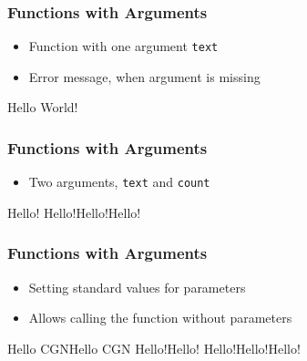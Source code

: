 \documentclass[ngerman]{beamer}
\newcommand{\ta}[1]{\textattachfile[color=1 0 0]{#1}{Code}}
\begin{document}
\begin{frame}[containsverbatim]
\frametitle{Functions with Arguments}

\begin{itemize}
	\item Function with one argument \texttt{text} 
	\item Error message, when argument is missing
\end{itemize}



\begin{ausgabe}
Hello World!
\end{ausgabe}

\end{frame}



\begin{frame}[containsverbatim]
\frametitle{Functions with Arguments}

\begin{itemize}
	\item Two arguments, \texttt{text} and \texttt{count}
\end{itemize}



\begin{ausgabe}

Hello!
Hello!Hello!Hello!

\end{ausgabe}

\end{frame}

\begin{frame}[containsverbatim]
\frametitle{Functions with Arguments}

\begin{itemize}
	\item Setting standard values for parameters
	\item Allows calling the function without parameters
\end{itemize}



\begin{ausgabe}
Hello CGNHello CGN
Hello!Hello!
Hello!Hello!Hello!
\end{ausgabe}

\end{frame}
\end{document}
